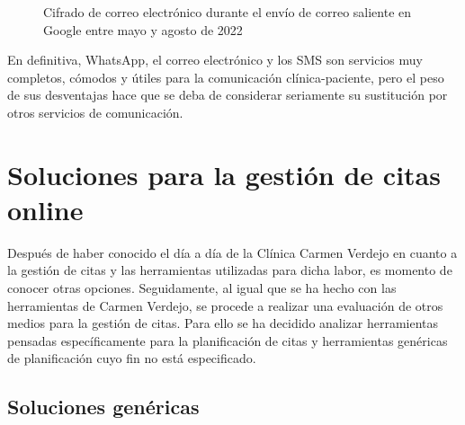 \begin{figure}[H]
    \caption{Cifrado de correo electrónico durante el envío de correo saliente en Google entre mayo y agosto de 2022}
    \label{fig:cifrado-correo}
\end{figure}

En definitiva, WhatsApp, el correo electrónico y los SMS son servicios muy completos, cómodos y útiles para la comunicación clínica-paciente, pero el peso de sus desventajas hace que se deba de considerar seriamente su sustitución por otros servicios de comunicación. 

\section{Soluciones para la gestión de citas online}
Después de haber conocido el día a día de la Clínica Carmen Verdejo en cuanto a la gestión de citas y las herramientas utilizadas para dicha labor, es momento de conocer otras opciones. Seguidamente, al igual que se ha hecho con las herramientas de Carmen Verdejo, se procede a realizar una evaluación de otros medios para la gestión de citas. Para ello se ha decidido analizar herramientas pensadas específicamente para la planificación de citas y herramientas genéricas de planificación cuyo fin no está especificado.

\subsection{Soluciones genéricas}

